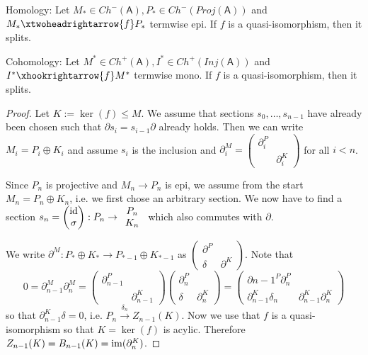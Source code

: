\documentclass[fontsize=11pt,fleqn,a4paper]{scrartcl}
\begin{document}
\begin{lemma}\label{homalg:splitting_quasi_isos}
\begin{minipage}{0.49\linewidth}
Homology: Let $M_\ast\in Ch^-(\mathsf{A}), P_\ast\in Ch^-(Proj(\mathsf{A}))$ and $M_\ast \xtwoheadrightarrow{f} P_\ast$ termwise epi. If $f$ is a quasi-isomorphism, then it splits.
\end{minipage} \hfill \begin{minipage}{0.49\linewidth}
Cohomology: Let $M^\ast\in Ch^+(\mathsf{A}), I^\ast\in Ch^+(Inj(\mathsf{A}))$ and $I^\ast \xhookrightarrow{f} M^\ast$ termwise mono. If $f$ is a quasi-isomorphism, then it splits.
\end{minipage}
\end{lemma}
\begin{proof}
Let $K:=\ker(f)\leq M$. We assume that sections $s_0,\ldots,s_{n-1}$ have already been chosen such that $\partial s_i = s_{i-1}\partial$ already holds. Then we can write $M_i = P_i\oplus K_i$ and assume $s_i$ is the inclusion and $\partial_i^M=\begin{pmatrix}\partial_i^P & \\ & \partial_i^K\end{pmatrix}$ for all $i<n$.

Since $P_n$ is projective and $M_n\to P_n$ is epi, we assume from the start $M_n=P_n\oplus K_n$, i.e. we first chose an arbitrary section. We now have to find a section $s_n=\begin{pmatrix}\operatorname{id}\\\sigma\end{pmatrix} : P_n \to \begin{array}{c}P_n\\K_n\end{array}$ which also commutes with $\partial$.

We write $\partial^M: P_\ast\oplus K_\ast \to P_{\ast-1}\oplus K_{\ast-1}$ as $\begin{pmatrix}\partial^P&\\\delta&\partial^K\end{pmatrix}$. Note that
\[0=\partial_{n-1}^M\partial_n^M = \begin{pmatrix}\partial_{n-1}^P & \\ & \partial_{n-1}^K\end{pmatrix} \begin{pmatrix} \partial_n^P & \\ \delta & \partial_n^K \end{pmatrix} = \begin{pmatrix}
\partial{n-1}^P \partial_n^P & \\\partial_{n-1}^K\delta_n&\partial_{n-1}^K \partial_n^K\end{pmatrix}\]
so that $\partial_{n-1}^K\delta = 0$, i.e. $P_n \xrightarrow{\delta_n} Z_{n-1}(K)$. Now we use that $f$ is a quasi-isomorphism so that $K=\ker(f)$ is acylic. Therefore $Z_{n-1}(K) = B_{n-1}(K)=\operatorname{im}(\partial_{n}^K)$.


\end{proof}
\end{document}
